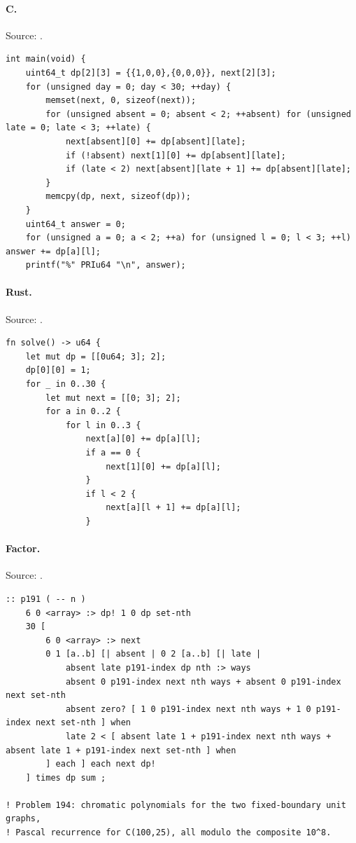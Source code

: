 \paragraph{C.} Source: .
\begin{lstlisting}
int main(void) {
    uint64_t dp[2][3] = {{1,0,0},{0,0,0}}, next[2][3];
    for (unsigned day = 0; day < 30; ++day) {
        memset(next, 0, sizeof(next));
        for (unsigned absent = 0; absent < 2; ++absent) for (unsigned late = 0; late < 3; ++late) {
            next[absent][0] += dp[absent][late];
            if (!absent) next[1][0] += dp[absent][late];
            if (late < 2) next[absent][late + 1] += dp[absent][late];
        }
        memcpy(dp, next, sizeof(dp));
    }
    uint64_t answer = 0;
    for (unsigned a = 0; a < 2; ++a) for (unsigned l = 0; l < 3; ++l) answer += dp[a][l];
    printf("%" PRIu64 "\n", answer);
\end{lstlisting}

\paragraph{Rust.} Source: .
\begin{lstlisting}
fn solve() -> u64 {
    let mut dp = [[0u64; 3]; 2];
    dp[0][0] = 1;
    for _ in 0..30 {
        let mut next = [[0; 3]; 2];
        for a in 0..2 {
            for l in 0..3 {
                next[a][0] += dp[a][l];
                if a == 0 {
                    next[1][0] += dp[a][l];
                }
                if l < 2 {
                    next[a][l + 1] += dp[a][l];
                }
\end{lstlisting}

\paragraph{Factor.} Source: .
\begin{lstlisting}
:: p191 ( -- n )
    6 0 <array> :> dp! 1 0 dp set-nth
    30 [
        6 0 <array> :> next
        0 1 [a..b] [| absent | 0 2 [a..b] [| late |
            absent late p191-index dp nth :> ways
            absent 0 p191-index next nth ways + absent 0 p191-index next set-nth
            absent zero? [ 1 0 p191-index next nth ways + 1 0 p191-index next set-nth ] when
            late 2 < [ absent late 1 + p191-index next nth ways + absent late 1 + p191-index next set-nth ] when
        ] each ] each next dp!
    ] times dp sum ;

! Problem 194: chromatic polynomials for the two fixed-boundary unit graphs,
! Pascal recurrence for C(100,25), all modulo the composite 10^8.
\end{lstlisting}

